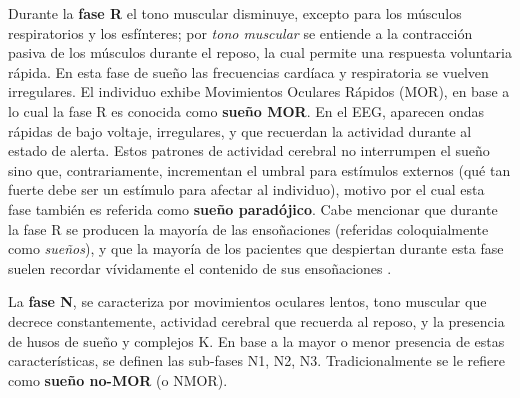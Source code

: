 Durante la \textbf{fase R} el tono muscular disminuye, excepto para los músculos respiratorios y 
los esfínteres;
%
por \textit{tono muscular} se entiende a la contracción pasiva de los músculos durante el reposo, la cual permite una respuesta voluntaria rápida.
%
En esta fase de sueño las frecuencias cardíaca y respiratoria se vuelven irregulares. 
%
El individuo exhibe Movimientos Oculares Rápidos (MOR), en base a lo cual la fase R es conocida como \textbf{sueño MOR}.
%
En el EEG, aparecen ondas rápidas de bajo voltaje, irregulares, y que recuerdan la actividad durante al estado de alerta. 
%
Estos patrones de actividad cerebral no interrumpen el sueño sino que, contrariamente, incrementan el umbral para estímulos externos (qué tan fuerte debe ser un estímulo para afectar al individuo), motivo por el cual esta fase también es referida como \textbf{sueño paradójico}.
%
Cabe mencionar que durante la fase R se producen la mayoría de las ensoñaciones (referidas coloquialmente como \textit{sueños}), y que la mayoría de los pacientes que despiertan durante esta fase suelen recordar vívidamente el contenido de sus ensoñaciones \cite{Rosales14}.

%
La \textbf{fase N}, se caracteriza por movimientos oculares lentos, tono muscular que decrece 
constantemente, actividad cerebral que recuerda al reposo, y la presencia de husos de sueño y 
complejos K. 
%
En base a la mayor o menor presencia de estas características, se definen las sub-fases N1, N2, N3.
%
Tradicionalmente se le refiere como \textbf{sueño no-MOR} (o NMOR).

